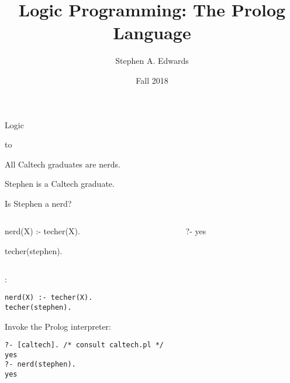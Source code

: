 \documentclass{plt}
\title{Logic Programming: The Prolog Language}
\author{Stephen A. Edwards}
\institute{Columbia University}
\date{Fall 2018}
\begin{document}
\maketitle

\begin{frame}[fragile]{Logic}

\vspace{4pt}

\hbox to 

\begin{center}
All Caltech graduates are nerds.

Stephen is a Caltech graduate.

Is Stephen a nerd?
\end{center}

\pause



\begin{columns}
  \begin{column}{0.5\textwidth}
\begin{prolog}
nerd(X) :- techer(X).

techer(stephen).
\end{prolog}
  \end{column}
  \begin{column}{0.3\textwidth}
\begin{interactive}
?- 
yes
\end{interactive}
  \end{column}
\end{columns}

\end{frame}


:
\begin{verbatim}
nerd(X) :- techer(X).
techer(stephen).
\end{verbatim}

Invoke the Prolog interpreter:

\begin{verbatim}
?- [caltech]. /* consult caltech.pl */
yes
?- nerd(stephen).
yes
\end{verbatim}
\end{document}
